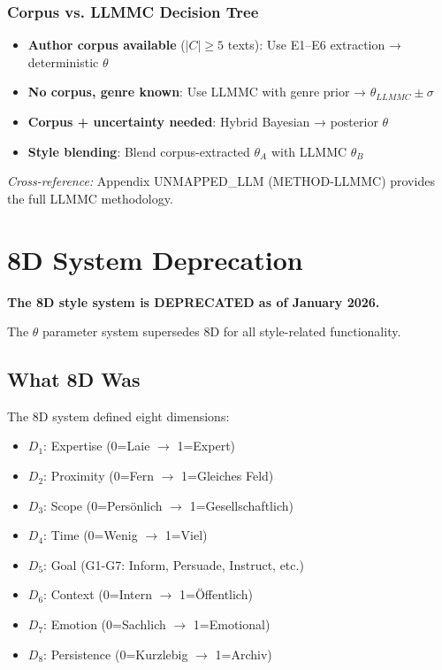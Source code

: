 \subsubsection{Corpus vs. LLMMC Decision Tree}

\begin{itemize}
    \item \textbf{Author corpus available} ($|C| \geq 5$ texts): Use E1--E6 extraction → deterministic $\theta$
    \item \textbf{No corpus, genre known}: Use LLMMC with genre prior → $\theta_{LLMMC} \pm \sigma$
    \item \textbf{Corpus + uncertainty needed}: Hybrid Bayesian → posterior $\theta$
    \item \textbf{Style blending}: Blend corpus-extracted $\theta_A$ with LLMMC $\theta_B$
\end{itemize}

\textit{Cross-reference:} Appendix UNMAPPED_LLM (METHOD-LLMMC) provides the full LLMMC methodology.


\section{8D System Deprecation}
\label{sec:sw-deprecation}

\begin{tcolorbox}[colback=red!5!white, colframe=red!75!black, title=⚠️ Deprecation Notice]
\textbf{The 8D style system is DEPRECATED as of January 2026.}

The $\theta$ parameter system supersedes 8D for all style-related functionality.
\end{tcolorbox}

\subsection{What 8D Was}
\label{sec:sw-8d-was}

The 8D system defined eight dimensions:

\begin{itemize}
    \item $D_1$: Expertise (0=Laie $\rightarrow$ 1=Expert)
    \item $D_2$: Proximity (0=Fern $\rightarrow$ 1=Gleiches Feld)
    \item $D_3$: Scope (0=Persönlich $\rightarrow$ 1=Gesellschaftlich)
    \item $D_4$: Time (0=Wenig $\rightarrow$ 1=Viel)
    \item $D_5$: Goal (G1-G7: Inform, Persuade, Instruct, etc.)
    \item $D_6$: Context (0=Intern $\rightarrow$ 1=Öffentlich)
    \item $D_7$: Emotion (0=Sachlich $\rightarrow$ 1=Emotional)
    \item $D_8$: Persistence (0=Kurzlebig $\rightarrow$ 1=Archiv)
\end{itemize}

